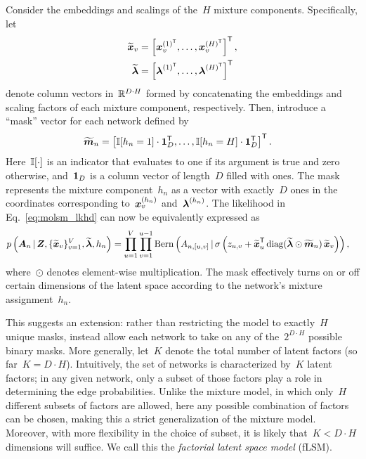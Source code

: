 Consider the embeddings and scalings of
the~$H$ mixture components.  Specifically, let
\begin{align}
  \widetilde{\boldsymbol{x}}_v &= \left[\boldsymbol{x}_v^{(1)^{\mathsf{T}}}, \ldots, \boldsymbol{x}_v^{(H)^{\mathsf{T}}}\right]^{\mathsf{T}}, \\
  \widetilde{\boldsymbol{\lambda}} &= \left[\boldsymbol{\lambda}^{(1)^{\mathsf{T}}}, \ldots, \boldsymbol{\lambda}^{(H)^{\mathsf{T}}} \right]^{\mathsf{T}}
\end{align}
denote column vectors in~$\mathbb{R}^{D \cdot H}$ formed by concatenating the
embeddings and scaling factors of each mixture component, respectively.
Then, introduce a ``mask'' vector for each network defined by
\begin{align}
  \widetilde{\boldsymbol{m}}_n &= \left[ \mathbb{I}[h_n=1] \cdot \boldsymbol{1}_D^{\mathsf{T}}, \ldots, \mathbb{I}[h_n=H] \cdot \boldsymbol{1}_D^{\mathsf{T}} \right]^{\mathsf{T}}.
\end{align}
Here~$\mathbb{I}[\cdot]$ is an indicator that evaluates to one if its
argument is true and zero otherwise, and~$\boldsymbol{1}_D$ is a column vector
of length~$D$ filled with ones. The mask represents
the mixture component~$h_n$ as a
vector with exactly~$D$ ones in the coordinates corresponding
to~$\boldsymbol{x}_v^{(h_n)}$ and~$\boldsymbol{\lambda}^{(h_n)}$. The likelihood in Eq.~\eqref{eq:molsm_lkhd} can now
be equivalently expressed as
\begin{align}
  \label{eq:flsm_lkhd}
  p \left(\boldsymbol{A}_n \, | \,
  \boldsymbol{Z}, \{\widetilde{\boldsymbol{x}}_v\}_{v=1}^V,
  \widetilde{\boldsymbol{\lambda}}, h_n \right) 
  &= \prod_{u=1}^V \prod_{v=1}^{u-1}
  \mathrm{Bern} \left(A_{n,[u,v]} \, | \,
    \sigma \left(z_{u,v} + \widetilde{\boldsymbol{x}}_{u}^{\mathsf{T}}
    \operatorname{diag}(\widetilde{\boldsymbol{\lambda}} \odot \widetilde{\boldsymbol{m}}_n) \,
    \widetilde{\boldsymbol{x}}_v \right) \right),
\end{align}
where~$\odot$ denotes element-wise multiplication. The mask effectively
turns on or off certain dimensions of the latent space according to
the network's mixture assignment~$h_n$.

This suggests an extension: rather than restricting the model
to exactly~$H$ unique masks, instead allow each network to take on any
of the~$2^{D \cdot H}$ possible binary masks. More generally, let~$K$
denote the total number of latent factors (so far~${K=D \cdot
  H}$). Intuitively, the set of networks is characterized by~$K$
latent factors; in any given network, only a subset of those factors
play a role in determining the edge probabilities. Unlike the mixture
model, in which only~$H$ different subsets of factors are allowed, here any
possible combination of factors can be chosen, making this a strict
generalization of the mixture model.  Moreover, with more flexibility
in the choice of subset, it is likely that~${K < D \cdot H}$
dimensions will suffice. We call this the \emph{factorial latent space model} (fLSM).

